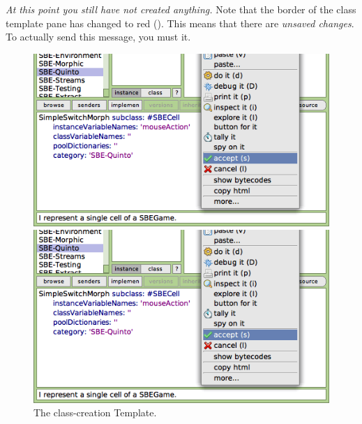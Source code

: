 \documentclass[a4paper,10pt,twoside]{book}
\begin{document}
\emph{At this point you still have not created anything.}
Note that the border of the class template pane has changed to red ().
This means that there are \emph{unsaved changes}.
To actually send this message, you must  it.

\begin{figure}[h!t]
\ifluluelse
	{\centerline {\includegraphics[width=\textwidth]{AcceptClassDef}}}
	{\centerline {\includegraphics[scale=0.7]{AcceptClassDef}}}
\caption{The class-creation Template.
\label{fig:acceptClassDef}}
\end{figure}
\end{document}
